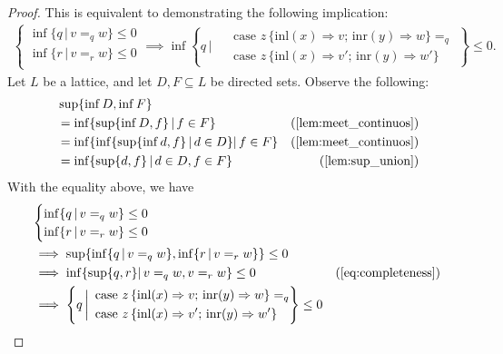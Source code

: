 \begin{proof}
   This is equivalent to demonstrating the following implication:
   \begin{align*}
    \begin{cases}
      \inf \{ q \, \vert \, v=_q w \} \leq 0 \\
      \inf \{ r \, \vert \, v=_r w \} \leq 0 \\
    \end{cases} \implies \inf \left\{q \, \bigg\vert \,  
    \begin{aligned}
       &\text{ case } z \,   \{\text{inl} (x) \Rightarrow v ; \, \text{inr} (y) \Rightarrow w\} =_{q} \\
       &\text{ case } z \,  \{\text{inl} (x) \Rightarrow v' ; \,\text{inr} (y) \Rightarrow w'\}
    \end{aligned}\right\} \leq 0.
   \end{align*}
Let $L$ be a lattice, and let $D, F \subseteq L$ be directed sets. Observe the following:
\begin{equation} \label{eq:completeness}
  \begin{split}
     & \sup \{ \inf D, \inf F \} \\\
    & = \inf \{ \sup \{\inf D, f\} \, \vert \, f \in F \} & (\text{\autoref{lem:meet_continuos}}) \\
    & = \inf \{ \inf\{ \sup \{\inf d, f\} \,\vert \, d \in D \} \vert \, f \in F \} & (\text{\autoref{lem:meet_continuos}}) \\
    & =  \inf \{  \sup \{d,f\} \, \vert \, d \in D, f \in F \} & (\text{\autoref{lem:sup_union}})
  \end{split}
  \end{equation}
With the equality above, we have
\begin{align*}
    &\begin{cases}
      \inf \{ q \, \vert \, v=_q w \} \leq 0 \\
      \inf \{ r \, \vert \, v=_r w \} \leq 0 \\
    \end{cases} \\
    &\implies  \sup \{ \inf \{ q \, \vert \, v=_q w \} , \inf \{ r \, \vert \, v=_r w \} \} \leq 0 \\
    & \implies \inf \{ \sup \{q,r\} \vert \,  v=_q w,  v=_r w  \} \leq 0 & (\text{\autoref{eq:completeness}})  \\
    & \implies \left\{q \, \bigg\vert \,  
    \begin{aligned}
       &\text{ case } z \,   \{\text{inl} (x) \Rightarrow v ; \, \text{inr} (y) \Rightarrow w\} =_{q}\\
        &\text{ case } z \,  \{\text{inl} (x) \Rightarrow v' ; \,\text{inr} (y) \Rightarrow w'\}
    \end{aligned}\right\} \leq 0
  \end{align*}




\end{proof}
